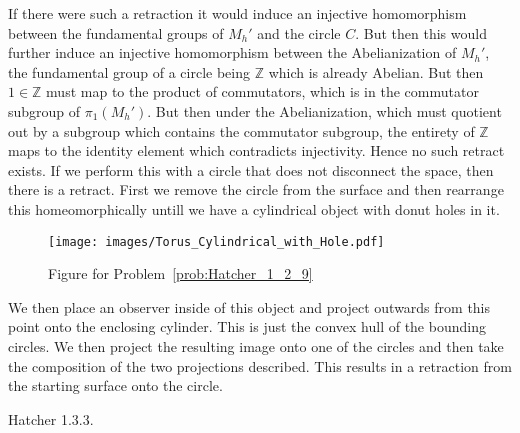     \begin{solution}
        If there were such a retraction it would induce an injective
        homomorphism between the fundamental groups of $M_{h}'$ and the circle
        $C$. But then this would further induce an injective homomorphism
        between the Abelianization of $M_{h}'$, the fundamental group of a
        circle being $\mathbb{Z}$ which is already Abelian. But then
        $1\in\mathbb{Z}$ must map to the product of commutators, which is in the
        commutator subgroup of $\pi_{1}(M_{h}')$. But then under the
        Abelianization, which must quotient out by a subgroup which contains the
        commutator subgroup, the entirety of $\mathbb{Z}$ maps to the identity
        element which contradicts injectivity. Hence no such retract exists. If
        we perform this with a circle that does not disconnect the space, then
        there is a retract. First we remove the circle from the surface and then
        rearrange this homeomorphically untill we have a cylindrical object with
        donut holes in it.
        \begin{figure}[H]
            \centering
            \captionsetup{type=figure}
            \texttt{[image: images/Torus\_Cylindrical\_with\_Hole.pdf]}
            \caption{Figure for Problem~\ref{prob:Hatcher_1_2_9}}
            \label{fig:Hatcher_1_2_9}
        \end{figure}
        We then place an observer inside of this object and project outwards
        from this point onto the enclosing cylinder. This is just the convex
        hull of the bounding circles. We then project the resulting image onto
        one of the circles and then take the composition of the two projections
        described. This results in a retraction from the starting surface onto
        the circle.
    \end{solution}
    \begin{problem}
        Hatcher 1.3.3.
    \end{problem}
